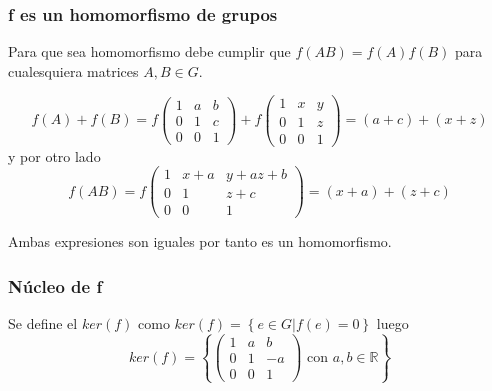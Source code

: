 \documentclass[12pt]{article}
\begin{document}
\subsubsection*{f es un homomorfismo de grupos}

Para que sea homomorfismo debe cumplir que $f(AB) = f(A)f(B)$ 
    para cualesquiera matrices $A,B \in G.$

    \begin{equation*}
        f(A)+ f(B)= 
        f 
        \begin{pmatrix}
            1 & a &  b\\
            0 & 1 & c\\
            0 & 0 & 1
            \end{pmatrix}
           +
            f %
        \begin{pmatrix}
            1 & x & y \\
            0 & 1 & z \\
            0 & 0 & 1
            \end{pmatrix}
            = (a+c)+(x + z) 
    \end{equation*}
    y por otro lado
    \begin{equation*}
        f(AB)= 
        f %
        \begin{pmatrix}
            1 & x+a & y + az + b\\
            0 & 1 & z + c\\
            0 & 0 & 1
            \end{pmatrix}
            = (x+a)+(z+c) 
    \end{equation*}
    
    Ambas expresiones son iguales por tanto es un homomorfismo. 

\subsubsection*{Núcleo de f}

Se define el $ker(f)$  como   $ker(f) = \left\{ e \in G | f(e) = 0\right\}$
luego 
\begin{equation*}
    ker(f) = \left\{ \begin{pmatrix}
        1 & a & b \\
        0 & 1 & -a \\
        0 & 0 & 1
        \end{pmatrix} \text{ con  } a,b \in \mathbb R\right\}
\end{equation*}
\end{document}
